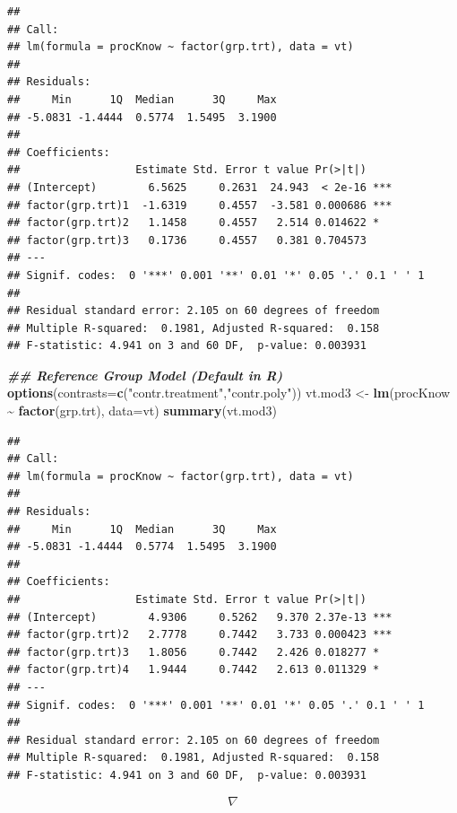 \documentclass[
]{book}
\newenvironment{Shaded}{\begin{snugshade}}{\end{snugshade}}
\newcommand{\AttributeTok}[1]{\textcolor[rgb]{0.13,0.29,0.53}{#1}}
\newcommand{\DocumentationTok}[1]{\textcolor[rgb]{0.56,0.35,0.01}{\textbf{\textit{#1}}}}
\newcommand{\FunctionTok}[1]{\textcolor[rgb]{0.13,0.29,0.53}{\textbf{#1}}}
\newcommand{\NormalTok}[1]{#1}
\newcommand{\OtherTok}[1]{\textcolor[rgb]{0.56,0.35,0.01}{#1}}
\newcommand{\SpecialCharTok}[1]{\textcolor[rgb]{0.81,0.36,0.00}{\textbf{#1}}}
\newcommand{\StringTok}[1]{\textcolor[rgb]{0.31,0.60,0.02}{#1}}
\begin{document}
\begin{verbatim}
## 
## Call:
## lm(formula = procKnow ~ factor(grp.trt), data = vt)
## 
## Residuals:
##     Min      1Q  Median      3Q     Max 
## -5.0831 -1.4444  0.5774  1.5495  3.1900 
## 
## Coefficients:
##                  Estimate Std. Error t value Pr(>|t|)    
## (Intercept)        6.5625     0.2631  24.943  < 2e-16 ***
## factor(grp.trt)1  -1.6319     0.4557  -3.581 0.000686 ***
## factor(grp.trt)2   1.1458     0.4557   2.514 0.014622 *  
## factor(grp.trt)3   0.1736     0.4557   0.381 0.704573    
## ---
## Signif. codes:  0 '***' 0.001 '**' 0.01 '*' 0.05 '.' 0.1 ' ' 1
## 
## Residual standard error: 2.105 on 60 degrees of freedom
## Multiple R-squared:  0.1981, Adjusted R-squared:  0.158 
## F-statistic: 4.941 on 3 and 60 DF,  p-value: 0.003931
\end{verbatim}

\begin{Shaded}
\begin{Highlighting}[]
\DocumentationTok{\#\# Reference Group Model (Default in R)}
\FunctionTok{options}\NormalTok{(}\AttributeTok{contrasts=}\FunctionTok{c}\NormalTok{(}\StringTok{"contr.treatment"}\NormalTok{,}\StringTok{"contr.poly"}\NormalTok{))}
\NormalTok{vt.mod3 }\OtherTok{\textless{}{-}} \FunctionTok{lm}\NormalTok{(procKnow }\SpecialCharTok{\textasciitilde{}} \FunctionTok{factor}\NormalTok{(grp.trt), }\AttributeTok{data=}\NormalTok{vt)}
\FunctionTok{summary}\NormalTok{(vt.mod3)}
\end{Highlighting}
\end{Shaded}

\begin{verbatim}
## 
## Call:
## lm(formula = procKnow ~ factor(grp.trt), data = vt)
## 
## Residuals:
##     Min      1Q  Median      3Q     Max 
## -5.0831 -1.4444  0.5774  1.5495  3.1900 
## 
## Coefficients:
##                  Estimate Std. Error t value Pr(>|t|)    
## (Intercept)        4.9306     0.5262   9.370 2.37e-13 ***
## factor(grp.trt)2   2.7778     0.7442   3.733 0.000423 ***
## factor(grp.trt)3   1.8056     0.7442   2.426 0.018277 *  
## factor(grp.trt)4   1.9444     0.7442   2.613 0.011329 *  
## ---
## Signif. codes:  0 '***' 0.001 '**' 0.01 '*' 0.05 '.' 0.1 ' ' 1
## 
## Residual standard error: 2.105 on 60 degrees of freedom
## Multiple R-squared:  0.1981, Adjusted R-squared:  0.158 
## F-statistic: 4.941 on 3 and 60 DF,  p-value: 0.003931
\end{verbatim}

\[\nabla\]
\end{document}

